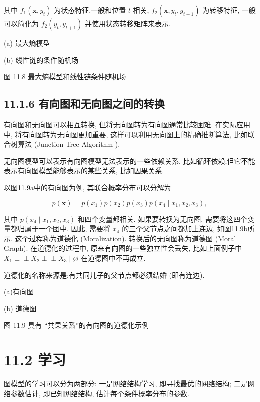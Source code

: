 \documentclass[10pt]{article}
\def\Perp{\perp\!\!\!\perp}
\begin{document}
其中 $f_{1}\left(\boldsymbol{x}, y_{t}\right)$ 为状态特征,一般和位置 $t$ 相关, $f_{2}\left(\boldsymbol{x}, y_{t}, y_{t+1}\right)$ 为转移特征, 一般可以简化为 $f_{2}\left(y_{t}, y_{t+1}\right)$ 并使用状态转移矩阵来表示.



(a) 最大熵模型



(b) 线性链的条件随机场

图 11.8 最大熵模型和线性链条件随机场

\subsection*{11.1.6 有向图和无向图之间的转换}
有向图和无向图可以相互转换, 但将无向图转为有向图通常比较困难. 在实际应用中, 将有向图转为无向图更加重要, 这样可以利用无向图上的精确推断算法, 比如联合树算法 (Junction Tree Algorithm ).

无向图模型可以表示有向图模型无法表示的一些依赖关系, 比如循环依赖;但它不能表示有向图模型能够表示的某些关系, 比如因果关系.

以图11.9a中的有向图为例, 其联合概率分布可以分解为


\begin{equation*}
p(\boldsymbol{x})=p\left(x_{1}\right) p\left(x_{2}\right) p\left(x_{3}\right) p\left(x_{4} \mid x_{1}, x_{2}, x_{3}\right), \tag{11.26}
\end{equation*}


其中 $p\left(x_{4} \mid x_{1}, x_{2}, x_{3}\right)$ 和四个变量都相关. 如果要转换为无向图, 需要将这四个变量都归属于一个团中. 因此, 需要将 $x_{4}$ 的三个父节点之间都加上连边, 如图11.9b所示. 这个过程称为道德化 (Moralization). 转换后的无向图称为道德图 (Moral Graph). 在道德化的过程中, 原来有向图的一些独立性会丢失, 比如上面例子中 $X_{1} \Perp X_{2} \Perp X_{3} \mid \varnothing$ 在道德图中不再成立.

道德化的名称来源是:有共同儿子的父节点都必须结婚 (即有连边).



(a)有向图



(b) 道德图

图 11.9 具有 “共果关系”的有向图的道德化示例

\section*{11.2 学习}
图模型的学习可以分为两部分: 一是网络结构学习, 即寻找最优的网络结构; 二是网络参数估计, 即已知网络结构, 估计每个条件概率分布的参数.
\end{document}
